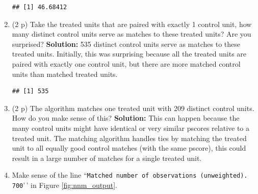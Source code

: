 \documentclass[
]{article}
\newenvironment{Shaded}{\begin{snugshade}}{\end{snugshade}}
\newcommand{\DecValTok}[1]{\textcolor[rgb]{0.00,0.00,0.81}{#1}}
\newcommand{\FunctionTok}[1]{\textcolor[rgb]{0.13,0.29,0.53}{\textbf{#1}}}
\newcommand{\NormalTok}[1]{#1}
\newcommand{\OtherTok}[1]{\textcolor[rgb]{0.56,0.35,0.01}{#1}}
\newcommand{\SpecialCharTok}[1]{\textcolor[rgb]{0.81,0.36,0.00}{\textbf{#1}}}
\begin{document}
\begin{enumerate}
\begin{Shaded}
\end{Shaded}

\begin{verbatim}
## [1] 46.68412
\end{verbatim}
\item
  (2 p) Take the treated units that are paired with exactly 1 control
  unit, how many distinct control units serve as matches to these
  treated units? Are you surprised? \newline \textbf{Solution:} 535
  distinct control units serve as matches to these treated units.
  Initially, this was surprising because all the treated units are
  paired with exactly one control unit, but there are more matched
  control units than matched treated units.

\begin{Shaded}
\end{Shaded}

\begin{verbatim}
## [1] 535
\end{verbatim}
\item
  (2 p) The algorithm matches one treated unit with 209 distinct control
  units. How do you make sense of this? \newline \textbf{Solution:} This
  can happen because the many control units might have identical or very
  similar pscores relative to a treated unit. The matching algorithm
  handles ties by matching the treated unit to all equally good control
  matches (with the same pscore), this could result in a large number of
  matches for a single treated unit.
\item
  Make sense of the line
  ``\texttt{Matched number of observations (unweighted). 700}'\,' in
  Figure \ref{fig:nnm_output}.


\end{enumerate}
\end{document}
